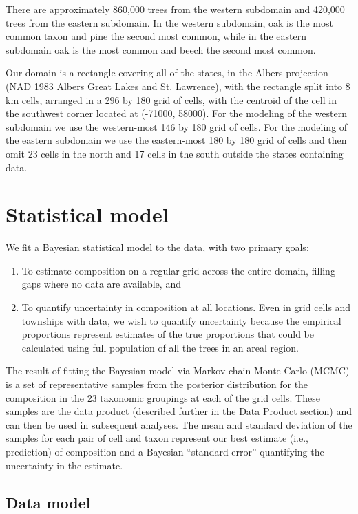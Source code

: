 \documentclass[12pt]{article}\usepackage[]{graphicx}\usepackage[]{color}
\begin{document}
There are approximately 860,000 trees from the western subdomain and
420,000 trees from the eastern subdomain. In the western subdomain,
oak is the most common taxon and pine the second most common, while
in the eastern subdomain oak is the most common and beech the second
most common.

Our domain is a rectangle covering all of the states, in the Albers
projection (NAD 1983 Albers Great Lakes and St. Lawrence), with the
rectangle split into 8 km cells, arranged in a 296 by 180 grid of
cells, with the centroid of the cell in the southwest corner located
at (-71000, 58000). For the modeling of the western subdomain we use
the western-most 146 by 180 grid of cells. For the modeling of the
eastern subdomain we use the eastern-most 180 by 180 grid of cells
and then omit 23 cells in the north and 17 cells in the south outside
the states containing data.


\section{Statistical model\label{sec:Statistical-model}}

We fit a Bayesian statistical model to the data, with two primary
goals:
\begin{enumerate}
\item To estimate composition on a regular grid across the entire domain,
filling gaps where no data are available, and
\item To quantify uncertainty in composition at all locations. Even in grid
cells and townships with data, we wish to quantify uncertainty because
the empirical proportions represent estimates of the true proportions
that could be calculated using full population of all the trees in
an areal region.
\end{enumerate}
The result of fitting the Bayesian model via Markov chain Monte Carlo
(MCMC) is a set of representative samples from the posterior distribution
for the composition in the 23 taxonomic groupings at each of the grid
cells. These samples are the data product (described further in the
Data Product section) and can then be used in subsequent analyses.
The mean and standard deviation of the samples for each pair of cell
and taxon represent our best estimate (i.e., prediction) of composition
and a Bayesian ``standard error'' quantifying the uncertainty in
the estimate. 


\subsection{Data model}
\end{document}
